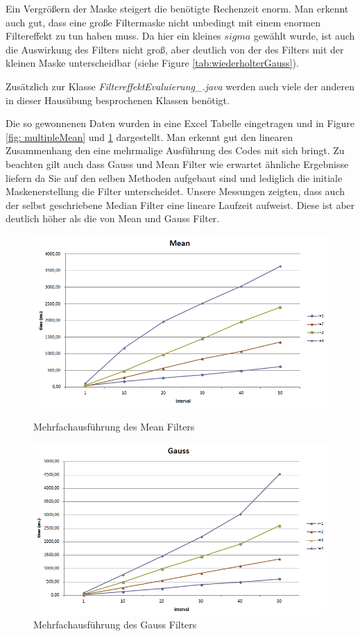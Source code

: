\documentclass[12pt,german]{article}
\begin{document}
Ein Vergrößern der Maske steigert die benötigte Rechenzeit enorm. Man erkennt auch gut, dass eine große Filtermaske nicht unbedingt mit einem enormen Filtereffekt zu tun haben muss. Da hier ein kleines $sigma$ gewählt wurde, ist auch die Auswirkung des Filters nicht groß, aber deutlich von der des Filters mit der kleinen Maske unterscheidbar (siehe Figure \ref{tab:wiederholterGauss}).


Zusätzlich zur Klasse \textit{FiltereffektEvaluierung\_.java} werden auch viele der anderen in dieser Hausübung besprochenen Klassen benötigt.


Die so gewonnenen Daten wurden in eine Excel Tabelle eingetragen und in  Figure \ref{fig: multipleMean} und \ref{fig: multipleGauss} dargestellt.  Man erkennt gut den linearen Zusammenhang den eine mehrmalige Ausführung des Codes mit sich bringt. Zu beachten gilt auch dass Gauss und Mean Filter wie erwartet ähnliche Ergebnisse liefern da Sie auf den selben Methoden aufgebaut sind und lediglich die initiale Maskenerstellung die Filter unterscheidet. Unsere Messungen zeigten, dass auch der selbst geschriebene Median Filter eine lineare Laufzeit aufweist. Diese ist aber deutlich höher als die von Mean und Gauss Filter.

\begin{figure} [H]
  \centering
  \includegraphics[width=12cm]{TimeEvaluationGraph_Mean.png}
  \caption{Mehrfachausführung des Mean Filters}
  \label{fig: multipleMean}
  \includegraphics[width=12cm]{TimeEvaluationGraph_Gauss.png}
  \caption{Mehrfachausführung des Gauss Filters}
  \label{fig: multipleGauss}
\end{figure}
\end{document}
